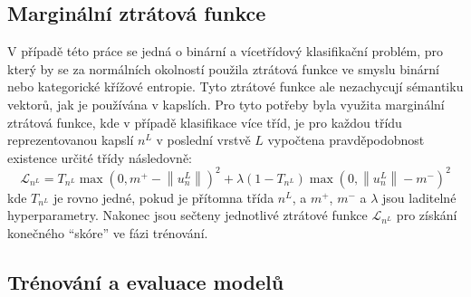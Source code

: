 \subsection{Marginální ztrátová funkce}
\label{subsec:marginalni_funkce}
V případě této práce se jedná o binární a vícetřídový klasifikační problém, pro
který by se za normálních okolností použila ztrátová funkce ve smyslu binární
nebo kategorické křížové entropie. Tyto ztrátové funkce ale nezachycují
sémantiku vektorů, jak je používána v kapslích. Pro tyto potřeby byla využita
marginální ztrátová funkce, kde v případě klasifikace více tříd, je pro každou
třídu reprezentovanou kapslí $n^L$ v poslední vrstvě $L$ vypočtena
pravděpodobnost existence určité třídy následovně:
\begin{equation}
    \mathcal{L}_{n^L}=T_{n^L} \max \left(0, m^{+}-\left\|u_n^L\right\|\right)^2+\lambda\left(1-T_{n^L}\right) \max \left(0,\left\|u_n^L\right\|-m^{-}\right)^2
\end{equation}
kde $T_{n^L}$ je rovno jedné, pokud je přítomna třída $n^L$, a $m^+$, $m^-$ a
$\lambda$ jsou laditelné hyperparametry. Nakonec jsou sečteny jednotlivé
ztrátové funkce $\mathcal{L}_{n^L}$ pro získání konečného \enquote{skóre} ve
fázi trénování.

\subsection{Trénování a evaluace modelů}
\label{subsec:trenovani_modelu}